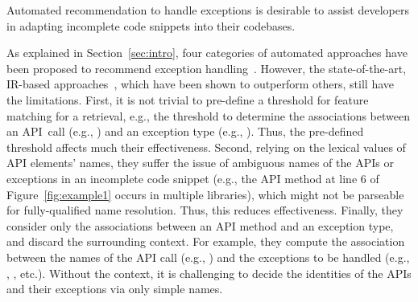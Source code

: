 \begin{Observation} 
\label{ob1}
Automated recommendation to handle exceptions is desirable to
assist developers in adapting incomplete code snippets into their
codebases.
\end{Observation}


As explained in Section~\ref{sec:intro},  four
categories of automated approaches have been proposed to recommend
exception
handling~\cite{xrank-fse20,barbosa-bsse12,chanchal-scam14,barbosa-tse18,barbosa-tse16}.
However, the state-of-the-art, IR-based approaches~\cite{xrank-fse20},
which have been shown to outperform others, still have the
limitations. First, it is not trivial to pre-define a threshold for
feature matching for a retrieval, e.g., the threshold to determine the
associations between an API~call (e.g., )
and an exception type (e.g., ). Thus,
the pre-defined threshold affects much their effectiveness.
%
Second, relying on the lexical values of API elements' names, they
suffer the issue of ambiguous names of the APIs or exceptions in an
incomplete code snippet (e.g., the API method  at line 6 of
Figure~\ref{fig:example1} occurs in multiple libraries), which might
not be parseable for fully-qualified name resolution. Thus, this
reduces effectiveness. Finally, they consider only the associations
between an API method and an exception type, and discard the
surrounding context.
For example, they compute the association between the names of the API
call (e.g., ) and the exceptions to be
handled (e.g., ,
, etc.). Without the context, it is
challenging to decide the identities of the APIs and their exceptions via
only simple names.

